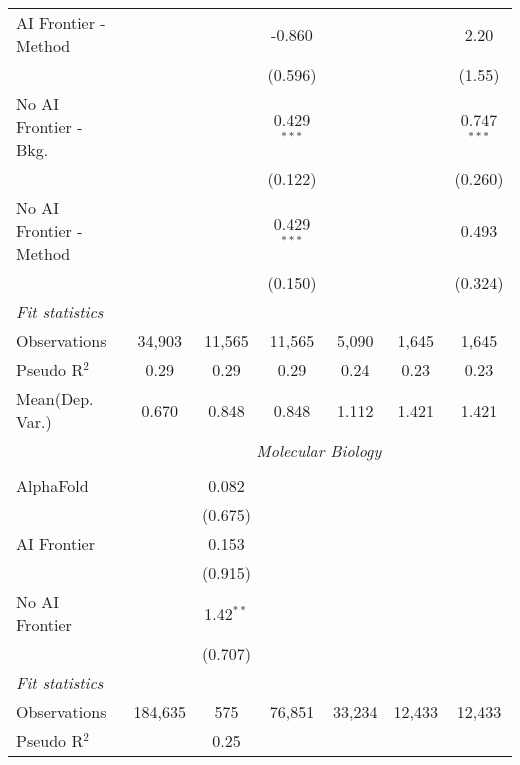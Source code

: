 \begin{tabular}{lcccccc}
   AI Frontier - Method    &               &               & -0.860        &              &              & 2.20\\   
                           &               &               & (0.596)       &              &              & (1.55)\\   
   No AI Frontier - Bkg.   &               &               & 0.429$^{***}$ &              &              & 0.747$^{***}$\\   
                           &               &               & (0.122)       &              &              & (0.260)\\   
   No AI Frontier - Method &               &               & 0.429$^{***}$ &              &              & 0.493\\   
                           &               &               & (0.150)       &              &              & (0.324)\\   
   \midrule
   \emph{Fit statistics}\\
   Observations            & 34,903        & 11,565        & 11,565        & 5,090        & 1,645        & 1,645\\  
   Pseudo R$^2$            & 0.29          & 0.29          & 0.29          & 0.24         & 0.23         & 0.23\\  
Mean(Dep. Var.) & 0.670 & 0.848 & 0.848 & 1.112 & 1.421 & 1.421 \\
   
 & \multicolumn{6}{c}{\textit{Molecular Biology}} \\ \\
   AlphaFold      &         & 0.082       &        &        &        &   \\   
                  &         & (0.675)     &        &        &        &   \\   
   AI Frontier    &         & 0.153       &        &        &        &   \\   
                  &         & (0.915)     &        &        &        &   \\   
   No AI Frontier &         & 1.42$^{**}$ &        &        &        &   \\   
                  &         & (0.707)     &        &        &        &   \\   
   \midrule
   \emph{Fit statistics}\\
   Observations   & 184,635 & 575         & 76,851 & 33,234 & 12,433 & 12,433\\  
   Pseudo R$^2$   &         & 0.25        &        &        &        & \\  
   

\end{tabular}
